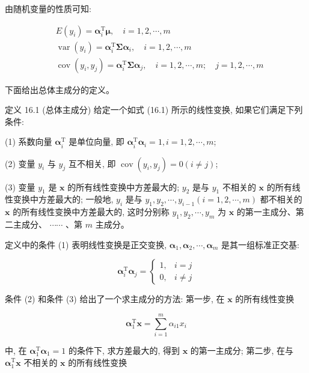 \documentclass[10pt]{article}
\begin{document}
由随机变量的性质可知:


\begin{align*}
& E\left(y_{i}\right)=\boldsymbol{\alpha}_{i}^{\mathrm{T}} \boldsymbol{\mu}, \quad i=1,2, \cdots, m  \tag{16.2}\\
& \operatorname{var}\left(y_{i}\right)=\boldsymbol{\alpha}_{i}^{\mathrm{T}} \boldsymbol{\Sigma} \boldsymbol{\alpha}_{i}, \quad i=1,2, \cdots, m  \tag{16.3}\\
& \operatorname{cov}\left(y_{i}, y_{j}\right)=\boldsymbol{\alpha}_{i}^{\mathrm{T}} \boldsymbol{\Sigma} \boldsymbol{\alpha}_{j}, \quad i=1,2, \cdots, m ; \quad j=1,2, \cdots, m \tag{16.4}
\end{align*}


下面给出总体主成分的定义。

定义 16.1 (总体主成分) 给定一个如式 (16.1) 所示的线性变换, 如果它们满足下列条件:

(1) 系数向量 $\boldsymbol{\alpha}_{i}^{\mathrm{T}}$ 是单位向量, 即 $\boldsymbol{\alpha}_{i}^{\mathrm{T}} \boldsymbol{\alpha}_{i}=1, i=1,2, \cdots, m$;

(2) 变量 $y_{i}$ 与 $y_{j}$ 互不相关, 即 $\operatorname{cov}\left(y_{i}, y_{j}\right)=0(i \neq j)$;

(3) 变量 $y_{1}$ 是 $\boldsymbol{x}$ 的所有线性变换中方差最大的; $y_{2}$ 是与 $y_{1}$ 不相关的 $\boldsymbol{x}$ 的所有线性变换中方差最大的; 一般地, $y_{i}$ 是与 $y_{1}, y_{2}, \cdots, y_{i-1}(i=1,2, \cdots, m)$ 都不相关的 $\boldsymbol{x}$ 的所有线性变换中方差最大的, 这时分别称 $y_{1}, y_{2}, \cdots, y_{m}$ 为 $\boldsymbol{x}$ 的第一主成分、第二主成分、 $\cdots \cdots$ 、第 $m$ 主成分。

定义中的条件 (1) 表明线性变换是正交变换, $\boldsymbol{\alpha}_{1}, \boldsymbol{\alpha}_{2}, \cdots, \boldsymbol{\alpha}_{m}$ 是其一组标准正交基:

$$
\boldsymbol{\alpha}_{i}^{\mathrm{T}} \boldsymbol{\alpha}_{j}=\left\{\begin{array}{cc}
1, & i=j \\
0, & i \neq j
\end{array}\right.
$$

条件 (2) 和条件 (3) 给出了一个求主成分的方法: 第一步, 在 $\boldsymbol{x}$ 的所有线性变换

$$
\boldsymbol{\alpha}_{1}^{\mathrm{T}} \boldsymbol{x}=\sum_{i=1}^{m} \alpha_{i 1} x_{i}
$$

中, 在 $\boldsymbol{\alpha}_{1}^{\mathrm{T}} \boldsymbol{\alpha}_{1}=1$ 的条件下, 求方差最大的, 得到 $\boldsymbol{x}$ 的第一主成分; 第二步, 在与 $\boldsymbol{\alpha}_{1}^{\mathrm{T}} \boldsymbol{x}$ 不相关的 $\boldsymbol{x}$ 的所有线性变换
\end{document}
